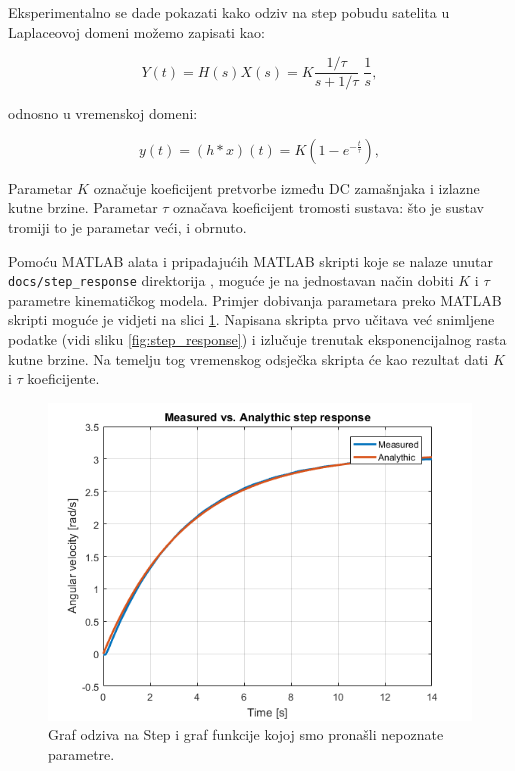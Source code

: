 \documentclass[times, utf8, diplomski, numeric]{templates/template}
\begin{document}
{{{            Eksperimentalno se dade pokazati kako odziv na step pobudu satelita u Laplaceovoj domeni možemo zapisati kao:

            \begin{equation}
                Y(t) = H(s)X(s) = K \frac{1/\tau}{s + 1/\tau} \; \frac{1}{s},
            \end{equation}

            odnosno u vremenskoj domeni:

            \begin{equation}
                y(t) = (h \ast x)(t) = K (1 - e^{-\frac{t}{\tau}}),
            \end{equation}

            Parametar $K$ označuje koeficijent pretvorbe između DC zamašnjaka i izlazne kutne brzine. Parametar $\tau$ označava koeficijent tromosti sustava: što je sustav tromiji to je parametar veći, i obrnuto.

            Pomoću MATLAB alata i pripadajućih MATLAB skripti koje se nalaze unutar \texttt{docs/step\_response} direktorija \cite{link_na_fit}, moguće je na jednostavan način dobiti $K$ i $\tau$ parametre kinematičkog modela. Primjer dobivanja parametara preko MATLAB skripti moguće je vidjeti na slici \ref{fig:fittana_funkcija}. Napisana skripta prvo učitava već snimljene podatke (vidi sliku \ref{fig:step_response}) i izlučuje trenutak eksponencijalnog rasta kutne brzine. Na temelju tog vremenskog odsječka skripta će kao rezultat dati $K$ i $\tau$ koeficijente. 

            \begin{figure}[htb]
            \centering
            \includegraphics[width=1.0\textwidth]{other/fittana_funkcija.png}
            \caption{Graf odziva na Step i graf funkcije kojoj smo pronašli nepoznate parametre.}
            \label{fig:fittana_funkcija}
            \end{figure}

}}}
\end{document}
